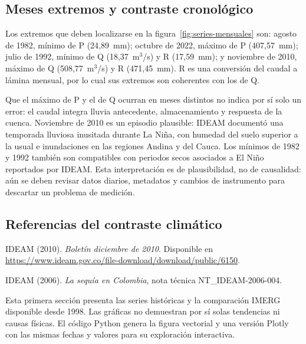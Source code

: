 \subsection{Meses extremos y contraste cronológico}
Los extremos que deben localizarse en la figura~\ref{fig:series-mensuales} son: agosto de 1982, mínimo de P (24,89~mm); octubre de 2022, máximo de P (407,57~mm); julio de 1992, mínimo de Q (18,37~m$^3$/s) y R (17,59~mm); y noviembre de 2010, máximo de Q (508,77~m$^3$/s) y R (471,45~mm). R es una conversión del caudal a lámina mensual, por lo cual sus extremos son coherentes con los de Q.

Que el máximo de P y el de Q ocurran en meses distintos no indica por sí solo un error: el caudal integra lluvia antecedente, almacenamiento y respuesta de la cuenca. Noviembre de 2010 es un episodio plausible: IDEAM documentó una temporada lluviosa inusitada durante La Niña, con humedad del suelo superior a la usual e inundaciones en las regiones Andina y del Cauca. Los mínimos de 1982 y 1992 también son compatibles con periodos secos asociados a El Niño reportados por IDEAM. Esta interpretación es de plausibilidad, no de causalidad: aún se deben revisar datos diarios, metadatos y cambios de instrumento para descartar un problema de medición.

\subsection{Referencias del contraste climático}
IDEAM (2010). \textit{Boletín diciembre de 2010}. Disponible en \url{https://www.ideam.gov.co/file-download/download/public/6150}.

IDEAM (2006). \textit{La sequía en Colombia}, nota técnica NT\_IDEAM-2006-004.

Esta primera sección presenta las series históricas y la comparación IMERG disponible desde 1998. Las gráficas no demuestran por sí solas tendencias ni causas físicas. El código Python genera la figura vectorial y una versión Plotly con las mismas fechas y valores para su exploración interactiva.